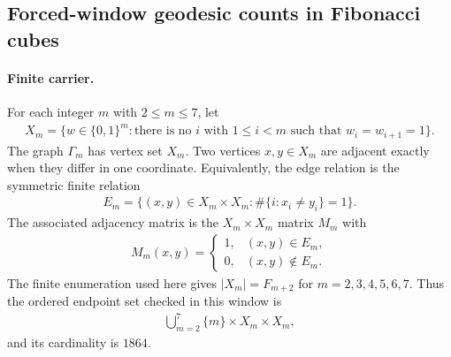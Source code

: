 
\subsection{Forced-window geodesic counts in Fibonacci cubes}
\label{sec:window-fibonacci-cube-geodesic-run-factorization}

\paragraph{Finite carrier.}
For each integer $m$ with $2 \leq m \leq 7$, let
$$
\begin{aligned}
X_m=\{w\in \{0,1\}^m : \text{there is no } i \text{ with } 1\leq i<m \text{ such that } w_i=w_{i+1}=1\}.
\end{aligned}
$$
The graph $\Gamma_m$ has vertex set $X_m$. Two vertices $x,y\in X_m$ are adjacent exactly when they differ in one coordinate. Equivalently, the edge relation is the symmetric finite relation
$$
\begin{aligned}
E_m=\{(x,y)\in X_m\times X_m : \#\{i: x_i\neq y_i\}=1\}.
\end{aligned}
$$
The associated adjacency matrix is the $X_m\times X_m$ matrix $M_m$ with
$$
\begin{aligned}
M_m(x,y)=
\begin{cases}
1, & (x,y)\in E_m,\\
0, & (x,y)\notin E_m.
\end{cases}
\end{aligned}
$$
The finite enumeration used here gives $|X_m|=F_{m+2}$ for $m=2,3,4,5,6,7$. Thus the ordered endpoint set checked in this window is
$$
\begin{aligned}
\bigcup_{m=2}^7 \{m\}\times X_m\times X_m,
\end{aligned}
$$
and its cardinality is $1864$.

